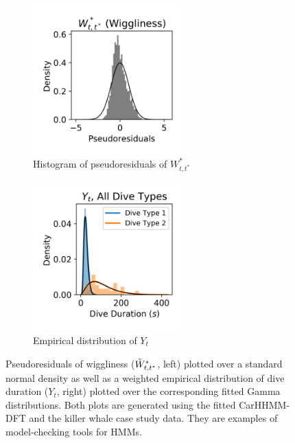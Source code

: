 \begin{figure}[ht]
    \begin{subfigure}{0.45\textwidth}
    	\centering
    	\includegraphics[width=2.25in]{../Plots/CarHHMM2_psedoresids_ahat.png}
    	\caption{Histogram of pseudoresiduals of $W^*_{t,t^*}$}
    	\label{fig:pseudoresids}
    \end{subfigure}
    \begin{subfigure}{0.45\textwidth}
    	\centering
    	\includegraphics[width=2.25in]{../Plots/CarHHMM2_empirical_hist_dive_duration.png}
    	\caption{Empirical distribution of $Y_t$}
    	\label{fig:empirical_dist}
    \end{subfigure}
    \caption{Pseudoresiduals of wiggliness ($\tilde{W}^*_{t,t^*}$, left) plotted over a standard normal density as well as a weighted empirical distribution of dive duration ($Y_t$, right) plotted over the corresponding fitted Gamma distributions. Both plots are generated using the fitted CarHHMM-DFT and the killer whale case study data. They are examples of model-checking tools for HMMs.}
    \label{fig:model_checking}
\end{figure}


